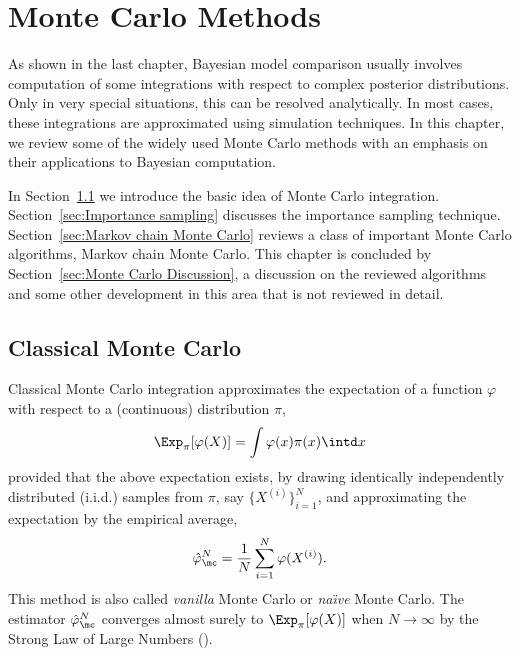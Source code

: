 \chapter{Monte Carlo Methods}
\label{cha:Monte Carlo Methods}

As shown in the last chapter, Bayesian model comparison usually involves computation of some integrations with respect to complex posterior distributions. Only in very special situations, this can be resolved analytically. In most cases, these integrations are approximated using simulation techniques. In this chapter, we review some of the widely used Monte Carlo methods with an emphasis on their applications to Bayesian computation.

In Section~\ref{sec:Classical Monte Carlo} we introduce the basic idea of Monte Carlo integration. Section~\ref{sec:Importance sampling} discusses the importance sampling technique. Section~\ref{sec:Markov chain Monte Carlo} reviews a class of important Monte Carlo algorithms, Markov chain Monte Carlo. This chapter is concluded by Section~\ref{sec:Monte Carlo Discussion}, a discussion on the reviewed algorithms and some other development in this area that is not reviewed in detail.

\section{Classical Monte Carlo}
\label{sec:Classical Monte Carlo}

Classical Monte Carlo integration approximates the expectation of a function $\varphi$ with respect to a (continuous) distribution $\pi$,
\begin{equation*}
  \Exp_{\pi}[\varphi(X)] = \int\varphi(x)\pi(x)\intd x
\end{equation*}
provided that the above expectation exists, by drawing identically independently distributed (i.i.d.) samples from $\pi$, say $\{X^{(i)}\}_{i=1}^N$, and approximating the expectation by the empirical average,
\begin{equation}
  \hat\varphi_{\mc}^N = \frac{1}{N}\sum_{i=1}^N\varphi(X^{(i)}).
  \label{eq:vanilla mc}
\end{equation}
This method is also called \emph{vanilla} Monte Carlo or \emph{na\"\i ve} Monte Carlo. The estimator $\hat\varphi_{\mc}^N$ converges almost surely to $\Exp_{\pi}[\varphi(X)]$ when $N\to\infty$ by the Strong Law of Large Numbers (\slln).

